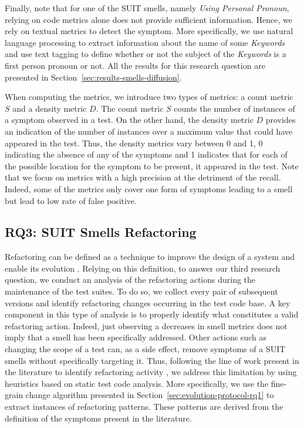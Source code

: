 Finally, note that for one of the SUIT smells, namely \emph{Using Personal Pronoun}, relying on code metrics alone does not provide sufficient information. Hence, we rely on textual metrics to detect the symptom. More specifically, we use natural language processing to extract information about the name of some \emph{Keywords} and use text tagging to define whether or not the subject of the \emph{Keywords} is a first person pronoun or not. All the results for this research question are presented in Section~\ref{sec:results-smells-diffusion}.

When computing the metrics, we introduce two types of metrics: a count metric $S$ and a density metric $D$. The count metric $S$ counts the number of instances of a symptom observed in a test. On the other hand, the density metric $D$ provides an indication of the number of instances over a maximum value that could have appeared in the test. Thus, the density metrics vary between 0 and 1, 0 indicating the absence of any of the symptoms and 1 indicates that for each of the possible location for the symptom to be present, it appeared in the test. Note that we focus on metrics with a high precision at the detriment of the recall. Indeed, some of the metrics only cover one form of symptoms leading to a smell but lead to low rate of false positive.

\subsection{RQ3: SUIT Smells Refactoring}
\label{sec:methodology-smell-evolution}

Refactoring can be defined as a technique to improve the design of a system and enable its evolution \cite{Fowler1999}. Relying on this definition, to answer our third research question, we conduct an analysis of the refactoring actions during the maintenance of the test suites. To do so, we collect every pair of subsequent versions and identify refactoring changes occurring in the test code base. A key component in this type of analysis is to properly identify what constitutes a valid refactoring action. Indeed, just observing a decreases in smell metrics does not imply that a smell has been specifically addressed. Other actions such as changing the scope of a test can, as a side effect, remove symptoms of a SUIT smells without specifically targeting it. Thus, following the line of work present in the literature to identify refactoring activity \cite{Tsantalis2013, Silva2017}, we address this limitation by using heuristics based on static test code analysis. More specifically, we use the fine-grain change algorithm presented in Section~\ref{sec:evolution-protocol-rq1} to extract instances of refactoring patterns. These patterns are derived from the definition of the symptoms present in the literature.


